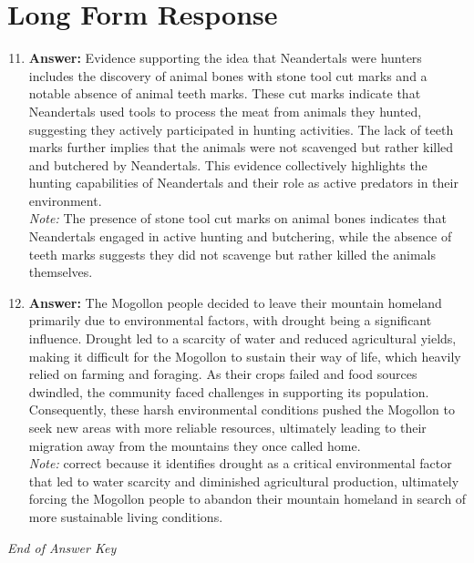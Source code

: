 \documentclass[12pt]{article}
\begin{document}
\section*{Long Form Response}
\begin{enumerate}[label=\arabic*.]
\setcounter{enumi}{10}
\item \textbf{Answer:} Evidence supporting the idea that Neandertals were hunters includes the discovery of animal bones with stone tool cut marks and a notable absence of animal teeth marks. These cut marks indicate that Neandertals used tools to process the meat from animals they hunted, suggesting they actively participated in hunting activities. The lack of teeth marks further implies that the animals were not scavenged but rather killed and butchered by Neandertals. This evidence collectively highlights the hunting capabilities of Neandertals and their role as active predators in their environment.
\\ \textit{Note:} The presence of stone tool cut marks on animal bones indicates that Neandertals engaged in active hunting and butchering, while the absence of teeth marks suggests they did not scavenge but rather killed the animals themselves.
\item \textbf{Answer:} The Mogollon people decided to leave their mountain homeland primarily due to environmental factors, with drought being a significant influence. Drought led to a scarcity of water and reduced agricultural yields, making it difficult for the Mogollon to sustain their way of life, which heavily relied on farming and foraging. As their crops failed and food sources dwindled, the community faced challenges in supporting its population. Consequently, these harsh environmental conditions pushed the Mogollon to seek new areas with more reliable resources, ultimately leading to their migration away from the mountains they once called home.
\\ \textit{Note:} correct because it identifies drought as a critical environmental factor that led to water scarcity and diminished agricultural production, ultimately forcing the Mogollon people to abandon their mountain homeland in search of more sustainable living conditions.
\end{enumerate}

\vfill
\noindent\textit{End of Answer Key}
\end{document}

